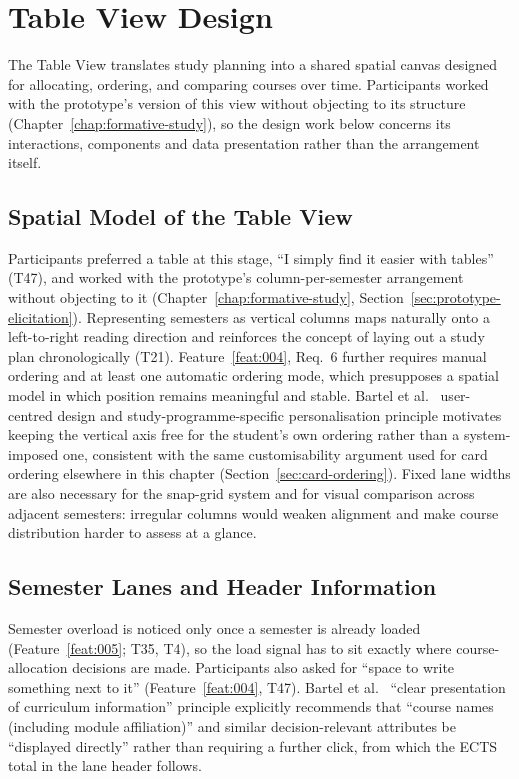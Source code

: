 \section{Table View Design}
\label{sec:table-view}

The Table View translates study planning into a shared spatial canvas designed for allocating, ordering, and comparing courses over time. Participants worked with the prototype's version of this view without objecting to its structure (Chapter~\ref{chap:formative-study}), so the design work below concerns its interactions, components and data presentation rather than the arrangement itself. 
\subsection{Spatial Model of the Table View}
\label{sec:table-spatial}
Participants preferred a table at this stage, \enquote{I simply find it easier with tables} (T47), and worked with the prototype's column-per-semester arrangement without objecting to it (Chapter~\ref{chap:formative-study}, Section~\ref{sec:prototype-elicitation}). Representing semesters as vertical columns maps naturally onto a left-to-right reading direction and reinforces the concept of laying out a study plan chronologically (T21). Feature~\ref{feat:004}, Req.~6 further requires manual ordering and at least one automatic ordering mode, which presupposes a spatial model in which position remains meaningful and stable. Bartel et al.~\cite{bartel_design_2024} user-centred design and study-programme-specific personalisation principle motivates keeping the vertical axis free for the student's own ordering rather than a system-imposed one, consistent with the same customisability argument used for card ordering elsewhere in this chapter (Section~\ref{sec:card-ordering}). Fixed lane widths are also necessary for the snap-grid system and for visual comparison across adjacent semesters: irregular columns would weaken alignment and make course distribution harder to assess at a glance.

\subsection{Semester Lanes and Header Information}
\label{sec:semester-lanes}

Semester overload is noticed only once a semester is already loaded (Feature~\ref{feat:005}; T35, T4), so the load signal has to sit exactly where course-allocation decisions are made. Participants also asked for \enquote{space to write something next to it} (Feature~\ref{feat:004}, T47). Bartel et al.~\cite{bartel_design_2024} \enquote{clear presentation of curriculum information} principle explicitly recommends that \enquote{course names (including module affiliation)} and similar decision-relevant attributes be \enquote{displayed directly} rather than requiring a further click, from which the ECTS total in the lane header follows.

